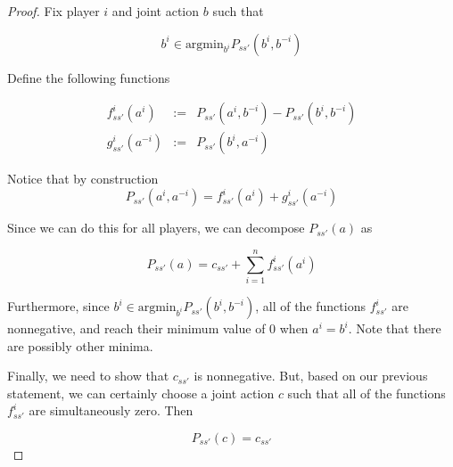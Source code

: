 \begin{proof}

Fix player $i$ and joint action $b$ such that

$$
b^i \in \text{argmin}_{b^i} P_{ss'}(b^i, b^{-i})
$$

Define the following functions


\begin{eqnarray*}
f^i_{ss'}(a^i) &:=& P_{ss'}(a^i, b^{-i}) - P_{ss'}(b^i, b^{-i}) \\
g^i_{ss'}(a^{-i}) &:=& P_{ss'}(b^i, a^{-i})
\end{eqnarray*}


Notice that by construction 
$$
P_{ss'}(a^i, a^{-i}) = f^i_{ss'}(a^i) + g^i_{ss'}(a^{-i})
$$

Since we can do this for all players, we can decompose $P_{ss'}(a)$ as

$$
P_{ss'}(a) = c_{ss'} + \sum_{i=1}^n f^i_{ss'}(a^i)
$$

Furthermore, since $b^i \in \text{argmin}_{b^i} P_{ss'}(b^i, b^{-i})$, all of the functions $f^i_{ss'}$ are nonnegative, and reach their minimum value of $0$ when $a^i = b^i$. Note that there are possibly other minima.

Finally, we need to show that $c_{ss'}$ is nonnegative. But, based on our previous statement, we can certainly choose a joint action $c$ such that all of the functions $f^i_{ss'}$ are simultaneously zero. Then

$$
P_{ss'}(c) = c_{ss'}
$$
\end{proof}



